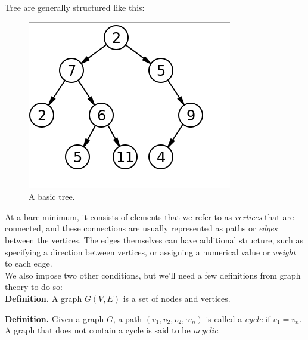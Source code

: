\documentclass[a4paper,10pt]{report}
\begin{document}
Tree are generally structured like this:
\begin{figure}[h!]
	\begin{centering}
	\begin{center}
	\includegraphics[width=\linewidth]{./Pictures/basic_tree.png}
	\caption{A basic tree.}
	\label{fig:basic_tree}
	\end{center}
	\par\end{centering}
\end{figure}

At a bare minimum, it consists of elements that we refer to as \textit{vertices} that are connected, and these connections are usually represented as paths or \textit{edges} between the vertices. The edges themselves can have additional structure, such as specifying a direction between vertices, or assigning a numerical value or \textit{weight} to each edge.\\

We also impose two other conditions, but we'll need a few definitions from graph theory to do so:\\

\textbf{Definition.} A graph $G(V,E)$ is a set of nodes and vertices.

\textbf{Definition.} Given a graph $G$, a path $(v_1, v_2, v_2, \cdot v_n)$ is called a \textit{cycle} if $v_1 = v_n$. A graph that does not contain a cycle is said to be \textit{acyclic}.

\hrulefill
\end{document}
